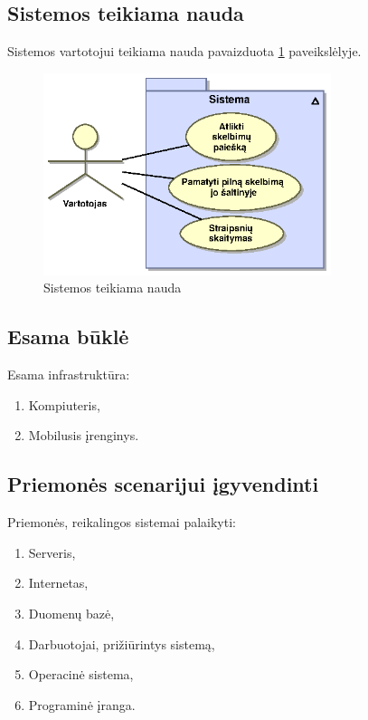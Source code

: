 \documentclass[12pt]{article}
\begin{document}
	\subsection{Sistemos teikiama nauda}
	Sistemos vartotojui teikiama nauda pavaizduota \ref{Gain} paveikslėlyje.
	
	\begin{figure}[h]
		\begin{center}
			\includegraphics[width=0.75\textwidth]{Nauda.eps}
			\caption{Sistemos teikiama nauda\label{Gain}}
		\end{center}
	\end{figure}
	\pagebreak
	
	\subsection{Esama būklė}
	Esama infrastruktūra:
	\begin{enumerate}
		\item{Kompiuteris,}
		\item{Mobilusis įrenginys.}
	\end{enumerate}
	
	\subsection{Priemonės scenarijui įgyvendinti}
	Priemonės, reikalingos sistemai palaikyti:
	\begin{enumerate}
		\item{Serveris,}
		\item{Internetas,}
		\item{Duomenų bazė,}
		\item{Darbuotojai, prižiūrintys sistemą,}
		\item{Operacinė sistema,}
		\item{Programinė įranga.}
	\end{enumerate}
	\pagebreak
	
\end{document}
